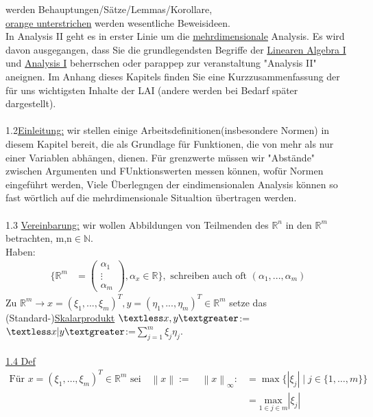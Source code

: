 \documentclass[11pt]{article}
\begin{document}
	 werden Behauptungen/Sätze/Lemmas/Korollare,\\
	\ul{orange unterstrichen} werden wesentliche Beweisideen.\\
	In Analysis II geht es in erster Linie um die  \underline{mehrdimensionale} Analysis.
	Es wird davon ausgegangen, dass Sie die grundlegendsten Begriffe der  \ul{Linearen Algebra I} und \ul{Analysis I} beherrschen oder parappep zur veranstaltung "Analysis II" aneignen.
	Im Anhang dieses Kapitels finden Sie eine Kurzzusammenfassung der für uns wichtigsten Inhalte der LAI (andere werden bei Bedarf später dargestellt).\\\\
	1.2\underline{Einleitung:} wir stellen einige Arbeitsdefinitionen(insbesondere Normen) in diesem Kapitel bereit, die als Grundlage für Funktionen, die von mehr als nur einer Variablen abhängen, dienen. Für grenzwerte müssen wir "Abstände" zwischen Argumenten und FUnktionswerten messen können, wofür Normen eingeführt werden, Viele Überlegngen der eindimensionalen Analysis können so fast wörtlich auf die mehrdimensionale Situaltion übertragen werden.\\\\
	1.3 \underline{Vereinbarung:} wir wollen Abbildungen von Teilmenden des $\mathbb{R}^n$ in den $\mathbb{R}^m$ betrachten, m,n$\in \mathbb{N}$.\\
	Haben:\\
	\begin{align}
		\{\mathbb{R}^m &= \begin{pmatrix} 
			\alpha_{1} \\				 
			\vdots \\
			\alpha_{m}
		\end{pmatrix}, \alpha_x \in \mathbb{R}\},\text{ schreiben auch oft } (\alpha_1,...,\alpha_m)
	\end{align}
	Zu $\mathbb{R}^m \rightarrow x =(\xi_1,...,\xi_m)^T, y=(\eta_1,...,\eta_m)^T \in \mathbb{R}^m$ setze das\\
	(Standard-)\ul{Skalarprodukt} 
	\ul{$\textless x,y\textgreater$}:=$\textless x|y\textgreater$:=$\sum_{j=1}^{m}\xi_j\eta_j$.\\ \\
	\underline{1.4 Def}
	\begin{align}
		\text{Für } x = (\xi_1, \dots, \xi_m)^T \in \mathbb{R}^m \text{ sei} \quad 
		\left\lVert x \right\rVert := \quad 
		\left\lVert x \right\rVert_{\infty} :&= \max \{ |\xi_j| \mid j \in \{1, \dots, m\} \}\nonumber\\ 
		&= \underset{1\in j\in m}{\text{max}} |\xi_j|\nonumber
	\end{align}
\end{document}
